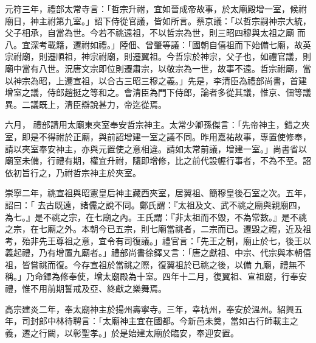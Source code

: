 \begin{pinyinscope}
 元符三年，禮部太常寺言：「哲宗升祔，宜如晉成帝故事，於太廟殿增一室，候祔廟日，神主祔第九室。」詔下侍從官議，皆如所言。蔡京議：「以哲宗嗣神宗大統，父子相承，自當為世。今若不祧遠祖，不以哲宗為世，則三昭四穆與太祖之廟
 而八。宜深考載籍，遷祔如禮。」陸佃、曾肇等議：「國朝自僖祖而下始備七廟，故英宗祔廟，則遷順祖，神宗祔廟，則遷翼祖。今哲宗於神宗，父子也，如禮官議，則廟中當有八世。況唐文宗即位則遷肅宗，以敬宗為一世，故事不遠。哲宗祔廟，當以神宗為昭，上遷宣祖，以合古三昭三穆之義。」先是，李清臣為禮部尚書，首建增室之議，侍郎趙挺之等和之。會清臣為門下侍郎，論者多從其議，惟京、佃等議異。二議既上，清臣辯說甚力，帝迄從焉。



 六月，
 禮部請用太廟東夾室奉安哲宗神主。太常少卿孫傑言：「先帝神主，錯之夾室，即是不得祔於正廟，與前詔增建一室之議不同。昨用嘉祐故事，專置使修奉，請以夾室奉安神主，亦與元置使之意相違。請如太常前議，增建一室。」尚書省以廟室未備，行禮有期，權宜升祔，隨即增修，比之前代設幄行事者，不為不至。詔依初旨行之，乃祔哲宗神主於夾室。



 崇寧二年，祧宣祖與昭憲皇后神主藏西夾室，居翼祖、簡穆皇後石室之次。五年，詔曰：「
 去古既遠，諸儒之說不同。鄭氏謂：『太祖及文、武不祧之廟與親廟四，為七。』是不祧之宗，在七廟之內。王氏謂：『非太祖而不毀，不為常數。』是不祧之宗，在七廟之外。本朝今已五宗，則七廟當祧者，二宗而已。遷毀之禮，近及祖考，殆非先王尊祖之意，宜令有司復議。」禮官言：「先王之制，廟止於七，後王以義起禮，乃有增置九廟者。」禮部尚書徐鐸又言：「唐之獻祖、中宗、代宗與本朝僖祖，皆嘗祧而復。今存宣祖於當祧之際，復翼祖於已祧之後，以備
 九廟，禮無不稱。」乃命鐸為修奉使，增太廟殿為十室。四年十二月，復翼祖、宣祖廟，行奉安禮，惟不用前期誓戒及亞、終獻之樂舞焉。



 高宗建炎二年，奉太廟神主於揚州壽寧寺。三年，幸杭州，奉安於溫州。紹興五年，司封郎中林待聘言：「太廟神主宜在國都。今新邑未奠，當如古行師載主之義，遷之行闕，以彰聖孝。」於是始建太廟於臨安，奉迎安置。



\end{pinyinscope}